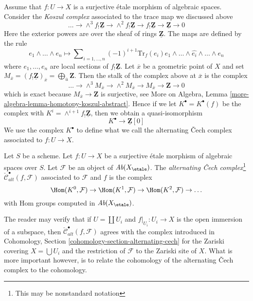 \medskip\noindent
Assume that $f : U \to X$ is a surjective \'etale
morphism of algebraic spaces. Consider the {\it Koszul complex}
associated to the trace map we discussed above
$$
\ldots \to \wedge^3f_!\underline{\mathbf{Z}} \to
\wedge^2f_!\underline{\mathbf{Z}} \to f_!\underline{\mathbf{Z}} \to
\underline{\mathbf{Z}} \to 0
$$
Here the exterior powers are over the sheaf of rings $\underline{\mathbf{Z}}$.
The maps are defined by the rule
$$
e_1 \wedge \ldots \wedge e_n \longmapsto
\sum\nolimits_{i = 1, \ldots, n} (-1)^{i + 1}
\text{Tr}_f(e_i)
e_1 \wedge \ldots \wedge \widehat{e_i} \wedge \ldots \wedge e_n
$$
where $e_1, \ldots, e_n$ are local sections of $f_!\underline{\mathbf{Z}}$.
Let $\overline{x}$ be a geometric point of $X$ and set
$M_{\overline{x}} = (f_!\underline{\mathbf{Z}})_{\overline{x}} =
\bigoplus_{\overline{u}} \mathbf{Z}$. Then the stalk of the complex above at
$\overline{x}$ is the complex
$$
\ldots \to \wedge^3 M_{\overline{x}} \to \wedge^2 M_{\overline{x}}
\to M_{\overline{x}} \to \mathbf{Z} \to 0
$$
which is exact because $M_{\overline{x}} \to \mathbf{Z}$ is surjective, see
More on Algebra, Lemma \ref{more-algebra-lemma-homotopy-koszul-abstract}.
Hence if we let $K^\bullet = K^\bullet(f)$ be the complex with
$K^i = \wedge^{i + 1}f_!\underline{\mathbf{Z}}$, then we obtain a
quasi-isomorphism
\begin{equation}
\label{equation-quasi-isomorphism}
K^\bullet \longrightarrow \underline{\mathbf{Z}}[0]
\end{equation}
We use the complex $K^\bullet$ to define what we call
the alternating {\v C}ech complex associated to $f : U \to X$.

\begin{definition}
\label{definition-alternating-cech-complex}
Let $S$ be a scheme. Let $f : U \to X$ be a surjective \'etale morphism
of algebraic spaces over $S$. Let $\mathcal{F}$ be an object of
$\textit{Ab}(X_\etale)$. The
{\it alternating {\v C}ech complex}\footnote{This may be nonstandard notation}
$\check{\mathcal{C}}^\bullet_{alt}(f, \mathcal{F})$
associated to $\mathcal{F}$ and $f$ is the complex
$$
\Hom(K^0, \mathcal{F}) \to \Hom(K^1, \mathcal{F}) \to
\Hom(K^2, \mathcal{F}) \to \ldots
$$
with Hom groups computed in $\textit{Ab}(X_\etale)$.
\end{definition}

\noindent
The reader may verify that if $U = \coprod U_i$ and $f|_{U_i} : U_i \to X$
is the open immersion of a subspace, then
$\check{\mathcal{C}}_{alt}^\bullet(f, \mathcal{F})$ agrees with the complex
introduced in
Cohomology, Section \ref{cohomology-section-alternating-cech}
for the Zariski covering $X = \bigcup U_i$ and the restriction
of $\mathcal{F}$ to the Zariski site of $X$. What is more important
however, is to relate the cohomology of the alternating
{\v C}ech complex to the cohomology.

